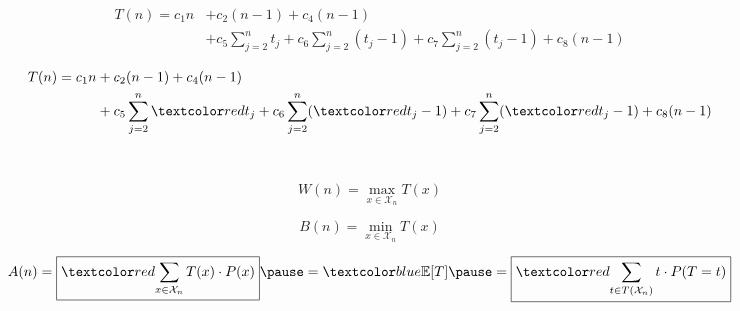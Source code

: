 \begin{frame}{}

  \pause
  \vspace{-0.30cm}
  \begin{align*}
    T(n) = c_1 n &+ c_2 (n-1) + c_4 (n-1) \\
    &+ c_5 \sum_{j=2}^{n} t_j + c_6 \sum_{j=2}^{n} (t_j - 1) + c_7 \sum_{j=2}^{n} (t_j - 1) + c_8 (n-1)
  \end{align*}

  \begin{center}
  \end{center}
\end{frame}
  
\begin{frame}

  \vspace{-0.30cm}
  \begin{align*}
    T(n) = c_1 n &+ c_2 (n-1) + c_4 (n-1) \\
    &+ c_5 \sum_{j=2}^{n} \red{t_j} + c_6 \sum_{j=2}^{n} (\red{t_j} - 1) + c_7 \sum_{j=2}^{n} (\red{t_j} - 1) + c_8 (n-1)
  \end{align*}

  \pause
  \begin{center}
  \end{center}
\end{frame}

\begin{frame}{}
  \begin{center}
  \end{center}

  \pause
  \vspace{0.50cm}
  \begin{center}
    {\large {}} \\[8pt] \pause
    {\large {}}
  \end{center}

  \pause
  \[
    W(n) = \max_{x \in \mathcal{X}_{n}} T(x)
  \]

  \pause
  \[
    B(n) = \min_{x \in \mathcal{X}_{n}} T(x)
  \]

  \pause
  \[
	A(n) = \boxed{\red{\sum_{x \in \mathcal{X}_{n}} T(x) \cdot P(x)}} \pause 
	     = \blue{\mathbb{E} [T]} \pause 
		 = \boxed{\red{\sum_{t \in T(\mathcal{X}_{n})} t \cdot P(T = t)}}
  \]
\end{frame}

